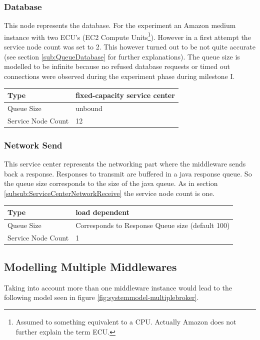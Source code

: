 \documentclass[a4paper]{article}
\begin{document}
\subsubsection{Database}
This node represents the database. For the experiment an Amazon medium instance with two ECU's (EC2 Compute Units\footnote{Assumed to something equivalent to a CPU. Actually Amazon does not further explain the term ECU.}). However in a first attempt the service node count was set to 2. This however turned out to be not quite accurate (see section \ref{sub:QueueDatabase} for further explanations).  The queue size is modelled to be infinite because no refused database requests or timed out connections were observed during the experiment phase during milestone I. \\

\begin{tabular}{|l|l|}
\hline 
Type & fixed-capacity service center \\ 
\hline 
Queue Size & unbound \\ 
\hline 
Service Node Count & 12 \\ 
\hline 
\end{tabular} 


\subsubsection{Network Send}
This service center represents the networking part where the middleware sends back a response. Responses to transmit are buffered in a java response queue. So the queue size corresponds to the size of the java queue. As in section  \ref{subsub:ServiceCenterNetworkReceive} the service node count is one. \\

\begin{tabular}{|l|l|}
\hline 
Type & load dependent \\ 
\hline 
Queue Size & Corresponds to Response Queue size (default 100)\\ 
\hline 
Service Node Count & 1 \\ 
\hline 
\end{tabular} 

\subsection{Modelling Multiple Middlewares}
Taking into account more than one middleware instance would lead to the following model seen in figure \ref{fig:systemmodel-multiplebroker}.
\end{document}
